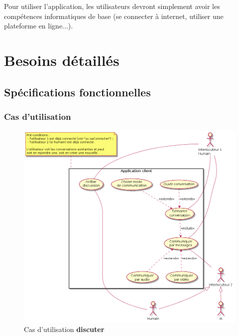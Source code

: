 \documentclass[11pt,dvipsnames,svgnames]{report}
\begin{document}
Pour utiliser l'application, les utilisateurs devront simplement avoir les compétences informatiques de base (se connecter à internet, utiliser une plateforme en ligne...).

\chapter{Besoins détaillés}
\section{Spécifications fonctionnelles}
\subsection{Cas d'utilisation}
\begin{figure}[H]
\includegraphics[scale=0.55]{images/uc-discuter.png}
\caption{Cas d'utilisation \textbf{discuter}}
\end{figure}
\end{document}
